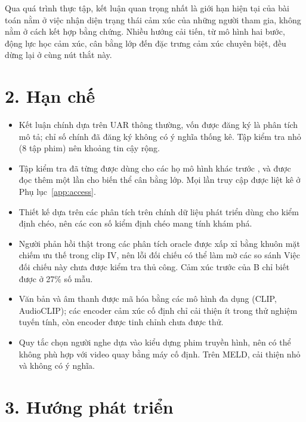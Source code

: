 Qua quá trình thực tập, kết luận quan trọng nhất là giới hạn hiện tại của bài toán nằm ở việc nhận diện trạng thái cảm xúc của những người tham gia, không nằm ở cách kết hợp bằng chứng. Nhiều hướng cải tiến, từ mô hình hai bước, động lực học cảm xúc, cân bằng lớp đến đặc trưng cảm xúc chuyên biệt, đều dừng lại ở cùng nút thắt này.

\section*{2. Hạn chế}

\begin{itemize}
	\item Kết luận chính dựa trên UAR thông thường, vốn được đăng ký là phân tích mô tả; chỉ số chính đã đăng ký không có ý nghĩa thống kê. Tập kiểm tra nhỏ (8 tập phim) nên khoảng tin cậy rộng.
	\item Tập kiểm tra đã từng được dùng cho các họ mô hình khác trước \model{}, và được đọc thêm một lần cho biến thể cân bằng lớp. Mọi lần truy cập được liệt kê ở Phụ lục~\ref{app:access}.
	\item Thiết kế \model{} dựa trên các phân tích trên chính dữ liệu phát triển dùng cho kiểm định chéo, nên các con số kiểm định chéo mang tính khám phá.
	\item Người phản hồi thật trong các phân tích oracle được xấp xỉ bằng khuôn mặt chiếm ưu thế trong clip IV, nên lỗi đối chiếu có thể làm mờ các so sánh Việc đối chiếu này chưa được kiểm tra thủ công. Cảm xúc trước của B chỉ biết được ở 27\% số mẫu.
	\item Văn bản và âm thanh được mã hóa bằng các mô hình đa dụng (CLIP, AudioCLIP); các encoder cảm xúc cố định chỉ cải thiện ít trong thử nghiệm tuyến tính, còn encoder được tinh chỉnh chưa được thử.
	\item Quy tắc chọn người nghe dựa vào kiểu dựng phim truyền hình, nên có thể không phù hợp với video quay bằng máy cố định. Trên MELD, cải thiện nhỏ và không có ý nghĩa.
\end{itemize}

\section*{3. Hướng phát triển}

